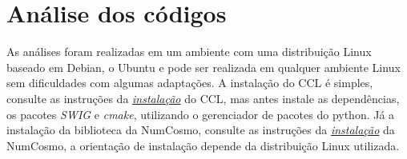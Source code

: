 	\chapter*{Análise dos códigos}

As análises foram realizadas em um ambiente com uma distribuição Linux baseado em Debian, o Ubuntu e pode ser realizada em qualquer ambiente Linux sem dificuldades com algumas adaptações. A instalação do CCL é simples, consulte as instruções da  \textit{\href{https://ccl.readthedocs.io/en/latest/source/installation.html}{\color{blue}instalação}} do CCL, mas antes instale as dependências, os pacotes \textit{SWIG} e \textit{cmake}, utilizando o gerenciador de pacotes do python. Já a instalação da biblioteca da NumCosmo, consulte as instruções da \textit{\href{https://numcosmo.github.io/download/}{\color{blue}instalação}} da NumCosmo, a orientação de instalação depende da distribuição Linux utilizada.

\begin{comment}		%
\section*{CCL - Core Cosmology Library}
O \href{https://ccl.readthedocs.io/en/latest/?badge=latest#core-cosmology-library}{\color{blue}CCL} ( Core Cosmology Library) é uma biblioteca padronizada de cosmologia que fornece rotinas para computar observáveis cosmológicos básico com alta precisão e foi verificada com um amplo conjunto de testes de validação (\textit{brenchmarks}). As previsões são fornecidas para muitas grandezas cosmológicas, incluindo distâncias, espectro de potência angular, funções de correlação e entre outras  \href{https://arxiv.org/abs/1812.05995}{\color{blue}suportadas}. 

O CCL é escrita em C e Python, com os códigos de cálculo numérico escrito em C e a orientação a objeto escrita em Python, possuindo uma API pública em python sem a necessidade da alteração na interface em C, em um pacote python, o \textit{pyccl}, com módulos intuitivos que permitem computar diversas grandezas cosmológicas suportadas, consulte a   \href{https://ccl.readthedocs.io/en/latest/api/modules.html}{\color{blue}documentação} do CCL.

\section*{NumCosmo}

NumCosmo é uma biblioteca C de software livre cujo objetivo principal é testar modelos cosmológicos usando dados observacionais e fornecer um conjunto de ferramentas para realizar cálculos cosmológicos. A \href{https://numcosmo.github.io/about/}{\color{blue}NumCosmo}  é escrita em C, possui orientação a objeto através do framework \textit{GObject} e\cite{virtualizacao2014} compatibilidade para linguagens que suportam introspecção Gobject, como Python, Perl e entre outros. 
\end{comment}

